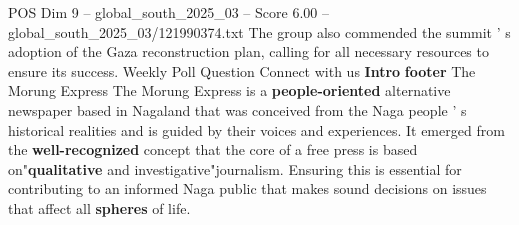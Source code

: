 \begin{textsample}{POS Dim 9 – global\_south\_2025\_03 – Score 6.00 – global\_south\_2025\_03/121990374.txt}
The group also commended the summit ' s adoption of the Gaza reconstruction plan, calling for all necessary resources to ensure its success.
Weekly Poll Question Connect with us \textbf{Intro} \textbf{footer} The Morung Express The Morung Express is a \textbf{people-oriented} alternative newspaper based in Nagaland that was conceived from the Naga people ' s historical realities and is guided by their voices and experiences.
It emerged from the \textbf{well-recognized} concept that the core of a free press is based on"\textbf{qualitative} and investigative"journalism.
Ensuring this is essential for contributing to an informed Naga public that makes sound decisions on issues that affect all \textbf{spheres} of life.

\end{textsample}
